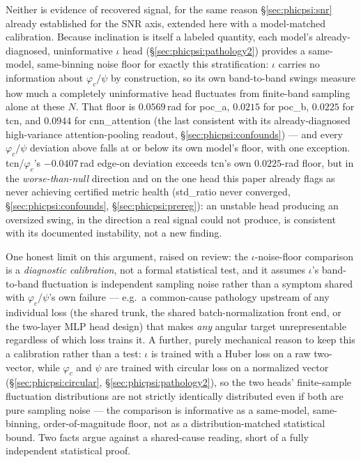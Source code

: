 \documentclass[11pt]{article}
\begin{document}
Neither is evidence of recovered signal, for the same reason \S\ref{sec:phicpsi:snr} already established for the SNR axis, extended here with a model-matched calibration.
Because inclination is itself a labeled quantity, each model's already-diagnosed, uninformative $\iota$ head (\S\ref{sec:phicpsi:pathology2}) provides a same-model, same-binning noise floor for exactly this stratification: $\iota$ carries no information about $\varphi_c/\psi$ by construction, so its own band-to-band swings measure how much a completely uninformative head fluctuates from finite-band sampling alone at these $N$.
That floor is $0.0569$\,rad for poc\_a, $0.0215$ for poc\_b, $0.0225$ for tcn, and $0.0944$ for cnn\_attention (the last consistent with its already-diagnosed high-variance attention-pooling readout, \S\ref{sec:phicpsi:confounds}) --- and every $\varphi_c/\psi$ deviation above falls at or below its own model's floor, with one exception.
tcn/$\varphi_c$'s $-0.0407$\,rad edge-on deviation exceeds tcn's own $0.0225$-rad floor, but in the \emph{worse-than-null} direction and on the one head this paper already flags as never achieving certified metric health (std\_ratio never converged, \S\ref{sec:phicpsi:confounds}, \S\ref{sec:phicpsi:prereg}): an unstable head producing an oversized swing, in the direction a real signal could not produce, is consistent with its documented instability, not a new finding.

One honest limit on this argument, raised on review: the $\iota$-noise-floor comparison is a \emph{diagnostic calibration}, not a formal statistical test, and it assumes $\iota$'s band-to-band fluctuation is independent sampling noise rather than a symptom shared with $\varphi_c/\psi$'s own failure --- e.g.\ a common-cause pathology upstream of any individual loss (the shared trunk, the shared batch-normalization front end, or the two-layer MLP head design) that makes \emph{any} angular target unrepresentable regardless of which loss trains it.
A further, purely mechanical reason to keep this a calibration rather than a test: $\iota$ is trained with a Huber loss on a raw two-vector, while $\varphi_c$ and $\psi$ are trained with circular loss on a normalized vector (\S\ref{sec:phicpsi:circular}, \S\ref{sec:phicpsi:pathology2}), so the two heads' finite-sample fluctuation distributions are not strictly identically distributed even if both are pure sampling noise --- the comparison is informative as a same-model, same-binning, order-of-magnitude floor, not as a distribution-matched statistical bound.
Two facts argue against a shared-cause reading, short of a fully independent statistical proof.
\end{document}
